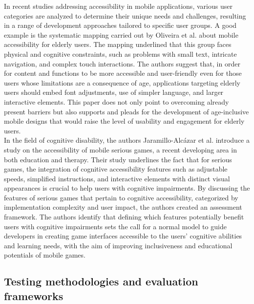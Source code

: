 In recent studies addressing accessibility in mobile applications, various user categories are analyzed to determine their unique needs and challenges, resulting in a range of development approaches tailored to specific user groups.
A good example is the systematic mapping carried out by Oliveira et al. \cite{oliveira2018elderly} about mobile accessibility for elderly users. The mapping underlined that this group faces physical and cognitive constraints, such as problems with small text, intricate navigation, and complex touch interactions. The authors suggest that, in order for content and functions to be more accessible and user-friendly even for those users whose limitations are a consequence of age, applications targeting elderly users should embed font adjustments, use of simpler language, and larger interactive elements. This paper does not only point to overcoming already present barriers but also supports and pleads for the development of age-inclusive mobile designs that would raise the level of usability and engagement for elderly users. \\

In the field of cognitive disability, the authors Jaramillo-Alcázar et al. \cite{jaramillo2017cognitive} introduce a study on the accessibility of mobile serious games, a recent developing area in both education and therapy. Their study underlines the fact that for serious games, the integration of cognitive accessibility features such as adjustable speeds, simplified instructions, and interactive elements with distinct visual appearances is crucial to help users with cognitive impairments. By discussing the features of serious games that pertain to cognitive accessibility, categorized by implementation complexity and user impact, the authors created an assessment framework. The authors identify that defining which features potentially benefit users with cognitive impairments sets the call for a normal model to guide developers in creating game interfaces accessible to the users' cognitive abilities and learning needs, with the aim of improving inclusiveness and educational potentials of mobile games.

\subsection{Testing methodologies and evaluation frameworks}


